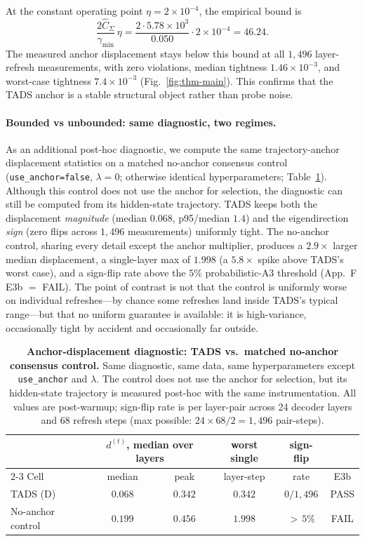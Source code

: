 At the constant operating point $\eta=2\times 10^{-4}$, the
empirical bound is
\[
\frac{2\hat{C}_\Sigma}{\gamma_{\min}}\,\eta
=
\frac{2\cdot 5.78\times 10^{3}}{0.050}\cdot 2\times 10^{-4}
=
46.24.
\]
The measured anchor displacement stays below this bound at all
$1{,}496$ layer-refresh measurements, with zero violations, median
tightness $1.46\times 10^{-3}$, and worst-case tightness
$7.4\times 10^{-3}$ (Fig.~\ref{fig:thm-main}). This confirms that
the \textsc{TADS} anchor is a stable structural object rather than
probe noise.

\paragraph{Bounded vs unbounded: same diagnostic, two regimes.}
As an additional post-hoc diagnostic, we compute the same
trajectory-anchor displacement statistics on a matched no-anchor
consensus control (\texttt{use\_anchor=false}, $\lambda=0$;
otherwise identical hyperparameters; Table~\ref{tab:dstep-spread}).
Although this control does not use the anchor for selection, the
diagnostic can still be computed from its hidden-state trajectory.
\textsc{TADS} keeps both the displacement \emph{magnitude} (median
$0.068$, p95/median $1.4$) and the eigendirection \emph{sign} (zero
flips across $1{,}496$ measurements) uniformly tight. The no-anchor
control, sharing every detail except the anchor multiplier, produces
a $2.9\times$ larger median displacement, a single-layer max of
$1.998$ (a $5.8\times$ spike above \textsc{TADS}'s worst case), and
a sign-flip rate above the $5\%$ probabilistic-A3 threshold
(App.~F E3b $=$ FAIL). The point of contrast is not that the control
is uniformly worse on individual refreshes---by chance some
refreshes land inside \textsc{TADS}'s typical range---but that no
uniform guarantee is available: it is high-variance, occasionally
tight by accident and occasionally far outside.
\begin{table}[t]
\centering
\caption{\textbf{Anchor-displacement diagnostic: \textsc{TADS} vs.\
matched no-anchor consensus control.} Same diagnostic, same data,
same hyperparameters except \texttt{use\_anchor} and $\lambda$.
The control does not use the anchor for selection, but its
hidden-state trajectory is measured post-hoc with the same
instrumentation. All values are post-warmup; sign-flip rate is per
layer-pair across 24 decoder layers and 68 refresh steps (max
possible: $24 \times 68 / 2 = 1{,}496$ pair-steps).}
\label{tab:dstep-spread}
\small
\setlength{\tabcolsep}{5pt}
\begin{tabular}{@{}lccccc@{}}
\toprule
 & \multicolumn{2}{c}{$d^{(t)}$, median over layers} & worst single & sign-flip & \\
\cmidrule(lr){2-3}
Cell & median & peak & layer-step & rate & E3b \\
\midrule
\textsc{TADS} (D)        & $0.068$ & $0.342$ & $0.342$ & $0 / 1{,}496$ & PASS \\
No-anchor control        & $0.199$ & $0.456$ & $1.998$ & ${>}\,5\%$    & FAIL \\
\bottomrule
\end{tabular}
\end{table}

